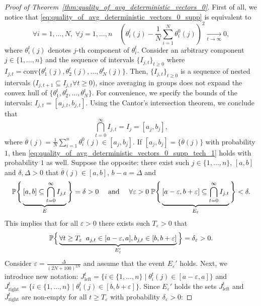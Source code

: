 \begin{proof}[Proof of Theorem~\ref{thm:quality_of_avg_deterministic_vectors_0}]
    First of all, we notice that \eqref{eq:quality_of_avg_deterministic_vectors_0_supp} is equivalent to
    \begin{equation}
    \forall i = 1,\ldots, N,\;\forall j=1,\ldots,n\quad \left(\theta^t_i(j) - \frac1N \sum_{i=1}^N \theta^0_i(j)\right)^2 \xrightarrow[t\to\infty]{} 0,\label{eq:quality_of_avg_deterministic_vectors_0_supp_tech_1}
    \end{equation}
    where $\theta_i^t(j)$ denotes $j$-th component of $\theta_i^t$. Consider an arbitrary component $j \in \{1,\ldots,n\}$ and the sequence of intervals $\{I_{j,t}\}_{t\ge 0}$ where $I_{j,t} = \text{conv}\{\theta_1^t(j),\theta_2^t(j),\ldots, \theta_N^t(j)\}$. Then, $\{I_{j,t}\}_{t\ge 0}$ is a sequence of nested intervals ($I_{j,t+1} \subseteq I_{j,t} \forall t\ge 0$), since averaging in groups does not expand the convex hull of $\{\theta_1^t,\theta_2^t,\ldots, \theta_N^t\}$. For convenience, we specify the bounds of the intervals: $I_{j,t} = [a_{j,t}, b_{j,t}]$. Using the Cantor's intersection theorem, we conclude that
    \begin{equation*}
        \bigcap\limits_{t=0}^\infty I_{j,t} = I_j = [a_j, b_j],
    \end{equation*}
    where $\overline{\theta}(j) = \frac{1}{N}\sum_{i=1}^n\theta_i^0(j) \in [a_j, b_j]$. If $[a_j, b_j] = \{\overline{\theta}(j)\}$ with probability $1$, then \eqref{eq:quality_of_avg_deterministic_vectors_0_supp_tech_1} holds with probability $1$ as well. Suppose the opposite: there exist such $j \in \{1,\ldots,n\}$, $[a,b]$ and $\delta,\Delta > 0$ that $\overline{\theta}(j) \in [a,b]$, $b-a = \Delta$ and
    \begin{equation*}
        \mathbb{P}\Bigg\{\underbrace{[a,b] \subseteq \bigcap\limits_{t=0}^\infty I_{j,t}}_{E}\Bigg\} = \delta > 0\quad \text{ and }\quad \forall \varepsilon > 0\; \mathbb{P}\Bigg\{\underbrace{[a-\varepsilon,b+\varepsilon] \subseteq \bigcap\limits_{t=0}^\infty I_{j,t}}_{E_{\varepsilon}}\Bigg\} < \delta.
    \end{equation*}
    This implies that for all $\varepsilon > 0$ there exists such $T_{\varepsilon} > 0$ that
    \begin{equation*}
        \mathbb{P}\Big\{\underbrace{\forall t \ge T_{\varepsilon}\;\; a_{j,t}\in [a-\varepsilon,a], b_{j,t}\in[b,b+\varepsilon]}_{E_{\varepsilon}'}\Big\} = \delta_{\varepsilon} > 0.
    \end{equation*}
    Consider $\varepsilon = \frac{\Delta}{(2N+100)^{2N}}$ and assume that the event $E_{\varepsilon}'$ holds. Next, we introduce new notation: $J_{\text{left}}^t = \{i \in \{1,\ldots, n\}\mid \theta_{i}^t(j) \in [a-\varepsilon,a]\}$ and $J_{\text{right}}^t = \{i \in \{1,\ldots, n\}\mid \theta_{i}^t(j) \in [b,b+\varepsilon]\}$. Since $E_{\varepsilon}'$ holds the sets $J_{\text{left}}^t$ and $J_{\text{right}}^t$ are non-empty for all $t\ge T_{\varepsilon}$ with probability $\delta_{\varepsilon} > 0$:

\end{proof}
